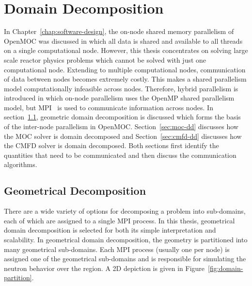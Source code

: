 \chapter{Domain Decomposition}
\label{chap:domain-decomposition}

In Chapter~\ref{chap:software-design}, the on-node shared memory parallelism of OpenMOC was discussed in which all data is shared and available to all threads on a single computational node. However, this thesis concentrates on solving large scale reactor physics problems which cannot be solved with just one computational node. Extending to multiple computational nodes, communication of data between nodes becomes extremely costly. This makes a shared parallelism model computationally infeasible across nodes. Therefore, hybrid parallelism is introduced in which on-node parallelism uses the OpenMP shared parallelism model, but \ac{MPI}~\cite{mpi} is used to communicate information across nodes. In section~\ref{sec:geometrical-decomposition}, geometric domain decomposition is discussed which forms the basis of the inter-node parallelism in OpenMOC. Section~\ref{sec:moc-dd} discusses how the \ac{MOC} solver is domain decomposed and Section~\ref{sec:cmfd-dd} discusses how the \ac{CMFD} solver is domain decomposed. Both sections first identify the quantities that need to be communicated and then discuss the communication algorithms.

\section{Geometrical Decomposition}
\label{sec:geometrical-decomposition}

There are a wide variety of options for decomposing a problem into sub-domains, each of which are assigned to a single \ac{MPI} process. In this thesis, geometrical domain decomposition is selected for both its simple interpretation and scalability. In geometrical domain decomposition, the geometry is partitioned into many geometrical sub-domains. Each \ac{MPI} process (usually one per node) is assigned one of the geometrical sub-domains and is responsible for simulating the neutron behavior over the region. A 2D depiction is given in Figure~\ref{fig:domain-partition}.

